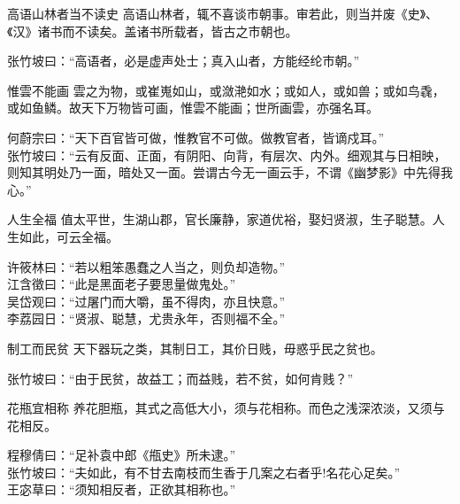 \begin{yulu}{高语山林者当不读史}
高语山林者，辄不喜谈市朝事。审若此，则当并废《史》、《汉》诸书而不读矣。盖诸书所载者，皆古之市朝也。
\begin{comments}
张竹坡曰：“高语者，必是虚声处士；真入山者，方能经纶市朝。”
\end{comments}
\end{yulu}

\begin{yulu}{惟雲不能画}
雲之为物，或崔嵬如山，或潋滟如水；或如人，或如兽；或如鸟毳，或如鱼鳞。故天下万物皆可画，惟雲不能画；世所画雲，亦强名耳。
\begin{comments}
何蔚宗曰：“天下百官皆可做，惟教官不可做。做教官者，皆谪戍耳。” \\
张竹坡曰：“云有反面、正面，有阴阳、向背，有层次、内外。细观其与日相映，则知其明处乃一面，暗处又一面。尝谓古今无一画云手，不谓《幽梦影》中先得我心。”
\end{comments}
\end{yulu}

\begin{yulu}{人生全福}
值太平世，生湖山郡，官长廉静，家道优裕，娶妇贤淑，生子聪慧。人生如此，可云全福。
\begin{comments}
许筱林曰：“若以粗笨愚蠢之人当之，则负却造物。” \\
江含徵曰：“此是黑面老子要思量做鬼处。” \\
吴岱观曰：“过屠门而大嚼，虽不得肉，亦且快意。” \\
李荔园日：“贤淑、聪慧，尤贵永年，否则福不全。”
\end{comments}
\end{yulu}

\begin{yulu}{制工而民贫}
天下器玩之类，其制日工，其价日贱，毋惑乎民之贫也。
\begin{comments}
张竹坡曰：“由于民贫，故益工；而益贱，若不贫，如何肯贱？”
\end{comments}
\end{yulu}

\begin{yulu}{花瓶宜相称}
养花胆瓶，其式之高低大小，须与花相称。而色之浅深浓淡，又须与花相反。
\begin{comments}
程穆倩曰：“足补袁中郎《甁史》所未逮。” \\
张竹坡曰：“夫如此，有不甘去南枝而生香于几案之右者乎!名花心足矣。” \\
王宓草曰：“须知相反者，正欲其相称也。”
\end{comments}
\end{yulu}

